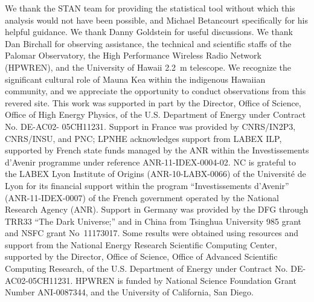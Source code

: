\documentclass{aastex61}   	%
\begin{document}
\acknowledgments
We thank the STAN team for providing the statistical tool without which this analysis would not have been possible,
and Michael Betancourt specifically for his helpful guidance.  We thank Danny Goldstein for useful discussions.
We thank Dan Birchall for observing assistance, the technical and
scientific staffs of the Palomar Observatory, the High Performance
Wireless Radio Network (HPWREN), and the University of Hawaii 2.2~m
telescope.  We recognize the significant cultural role of Mauna Kea
within the indigenous Hawaiian community, and we appreciate the
opportunity to conduct observations from this revered site.  This
work was supported in part by the Director, Office of Science,
Office of High Energy Physics, of the U.S. Department of Energy
under Contract No. DE-AC02- 05CH11231.  Support in France was
provided by CNRS/IN2P3, CNRS/INSU, and PNC; LPNHE acknowledges
support from LABEX ILP, supported by French state funds managed by
the ANR within the Investissements d'Avenir programme under reference
ANR-11-IDEX-0004-02.  NC is grateful to the LABEX Lyon Institute
of Origins (ANR-10-LABX-0066) of the Universit\'e de Lyon for its
financial support within the program ``Investissements d'Avenir''
(ANR-11-IDEX-0007) of the French government operated by the National
Research Agency (ANR).  Support in Germany was provided by the DFG
through TRR33 ``The Dark Universe;'' and in China from Tsinghua
University 985 grant and NSFC grant No~11173017.  Some results were
obtained using resources and support from the National Energy
Research Scientific Computing Center, supported by the Director,
Office of Science, Office of Advanced Scientific Computing Research,
of the U.S. Department of Energy under Contract No. DE-AC02-05CH11231.
HPWREN is funded by National Science Foundation Grant Number
ANI-0087344, and the University of California, San Diego.




\end{document}

